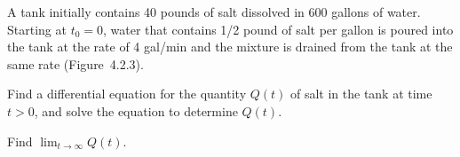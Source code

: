 \setcounter{example}{2}
\begin{example}
  \label{example:4.2.3} \rm A tank initially contains 40 pounds of salt dissolved in 600 gallons of
  water. Starting at $t_{0}=0$, water that contains 1/2 pound of salt per gallon is poured into the
  tank at the rate of 4 gal/min and the mixture is drained from the tank at the same rate
  (Figure~4.2.3).
  \begin{alist}
    \item %
    Find a differential equation for the quantity $Q(t)$ of salt in the tank at time $t>0$, and
    solve the equation to determine $Q(t)$.

    \item %
    Find $\lim_{t\to\infty}Q(t)$.
  \end{alist}
\end{example}
\setcounter{equation}{4}
